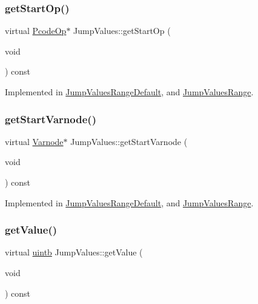 \subsubsection{\texorpdfstring{getStartOp()}{getStartOp()}}
{\footnotesize\ttfamily virtual \mbox{\hyperlink{class_pcode_op}{Pcode\+Op}}$\ast$ Jump\+Values\+::get\+Start\+Op (\begin{DoxyParamCaption}\item[{void}]{ }\end{DoxyParamCaption}) const\hspace{0.3cm}{\ttfamily [pure virtual]}}



Implemented in \mbox{\hyperlink{class_jump_values_range_default_a57e9f0efc13c6864527cc0b1aa2017a7}{Jump\+Values\+Range\+Default}}, and \mbox{\hyperlink{class_jump_values_range_a22ef1c5380849124e596224bac24413e}{Jump\+Values\+Range}}.

\mbox{\label{class_jump_values_a6505dbaeb1e61b7d60aff3e9f1947941}} 
\subsubsection{\texorpdfstring{getStartVarnode()}{getStartVarnode()}}
{\footnotesize\ttfamily virtual \mbox{\hyperlink{class_varnode}{Varnode}}$\ast$ Jump\+Values\+::get\+Start\+Varnode (\begin{DoxyParamCaption}\item[{void}]{ }\end{DoxyParamCaption}) const\hspace{0.3cm}{\ttfamily [pure virtual]}}



Implemented in \mbox{\hyperlink{class_jump_values_range_default_a65b5aaf23fe237b5feb699050f75da54}{Jump\+Values\+Range\+Default}}, and \mbox{\hyperlink{class_jump_values_range_a1652b9c2b1e6cedf3d80452cfe5aa37f}{Jump\+Values\+Range}}.

\mbox{\label{class_jump_values_a152463d975b9364369d2036dafd59303}} 
\subsubsection{\texorpdfstring{getValue()}{getValue()}}
{\footnotesize\ttfamily virtual \mbox{\hyperlink{types_8h_a2db313c5d32a12b01d26ac9b3bca178f}{uintb}} Jump\+Values\+::get\+Value (\begin{DoxyParamCaption}\item[{void}]{ }\end{DoxyParamCaption}) const\hspace{0.3cm}{\ttfamily [pure virtual]}}



